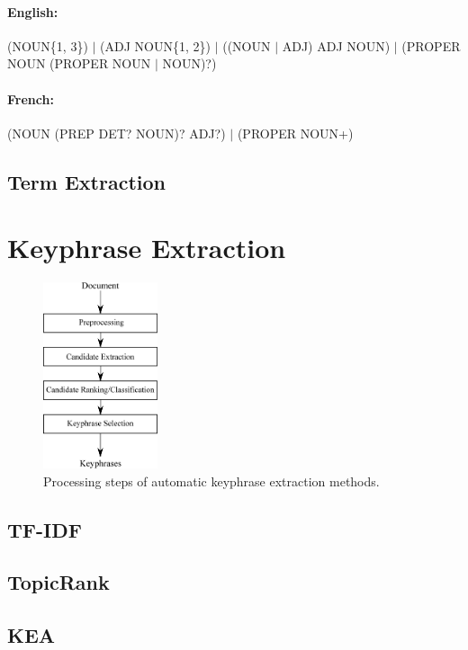     \paragraph{English:} (NOUN\{1, 3\}) $|$ (ADJ NOUN\{1, 2\}) $|$ ((NOUN $|$ ADJ) ADJ NOUN) $|$ (PROPER NOUN (PROPER NOUN $|$ NOUN)?)
    \paragraph{French:} (NOUN (PREP DET? NOUN)? ADJ?) $|$ (PROPER NOUN+)

  \subsection{Term Extraction}
  \label{subsec:term_extraction}

\section{Keyphrase Extraction}
\label{sec:keyphrase_extraction}
  \begin{figure}
    \centering
    \includegraphics[width=0.3\textwidth]{include/processing_steps.eps}
    \caption{Processing steps of automatic keyphrase extraction methods.
             \label{fig:processing_steps}}
  \end{figure}

  \subsection{TF-IDF}
  \label{subsec:tfidf}
  \subsection{TopicRank}
  \label{subsec:topicrank}
  \subsection{KEA}
  \label{subsec:kea}


